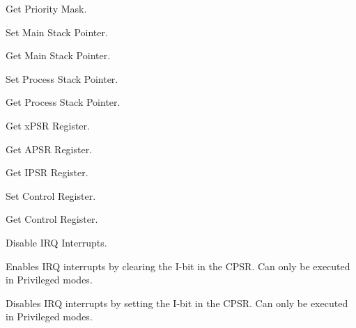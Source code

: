 Get Priority Mask.

Set Main Stack Pointer.

Get Main Stack Pointer.

Set Process Stack Pointer.

Get Process Stack Pointer.

Get x\+P\+SR Register.

Get A\+P\+SR Register.

Get I\+P\+SR Register.

Set Control Register.

Get Control Register.

Disable I\+RQ Interrupts.

Enables I\+RQ interrupts by clearing the I-\/bit in the C\+P\+SR. Can only be executed in Privileged modes.

Disables I\+RQ interrupts by setting the I-\/bit in the C\+P\+SR. Can only be executed in Privileged modes.

